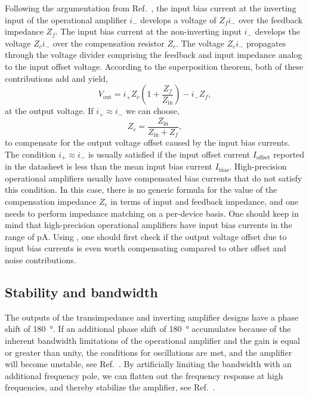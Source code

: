 Following the argumentation from Ref.~\cite[p.~383]{Terrel96}, the input bias current at the inverting input of the operational amplifier $i_-$ develops a voltage of $Z_fi_-$ over the feedback impedance $Z_f$.
The input bias current at the non-inverting input $i_-$ develops the voltage $Z_ci_-$ over the compensation resistor $Z_c$.
The voltage $Z_ci_-$ propagates through the voltage divider comprising the feedback and input impedance analog to the input offset voltage.
According to the superposition theorem, both of these contributions add and yield,
\begin{equation}
	V_\text{out}=i_+Z_c\left(1+\frac{Z_f}{Z_\text{in}}\right)-i_-Z_f
	\label{eq:input_bias_current},
\end{equation}
at the output voltage.
If $i_+\approx i_-$ we can choose,
\begin{equation}
	Z_c=\frac{Z_\text{in}}{Z_\text{in}+Z_f},
\end{equation}
 to compensate for the output voltage offset caused by the input bias currents.
The condition $i_+\approx i_-$ is usually satisfied if the input offset current $I_\text{offset}$ reported in the datasheet is less than the mean input bias current $I_\text{bias}$.
High-precision operational amplifiers usually have compensated bias currents that do not satisfy this condition.
In this case, there is no generic formula for the value of the compensation impedance $Z_c$ in terms of input and feedback impedance, and one needs to perform impedance matching on a per-device basis.
One should keep in mind that high-precision operational amplifiers have input bias currents in the range of \si{\pico\ampere}.
Using , one should first check if the output voltage offset due to input bias currents is even worth compensating compared to other offset and noise contributions.

\subsection{Stability and bandwidth}\label{sec:opamp_stability_bandwidth}

The outputs of the transimpedance and inverting amplifier designs have a phase shift of \SI{180}{\degree}.
If an additional phase shift of \SI{180}{\degree} accumulates because of the inherent bandwidth limitations of the operational amplifier and the gain is equal or greater than unity, the conditions for oscillations are met, and the amplifier will become unstable, see Ref.~\cite[p.~395]{Terrel96}.
By artificially limiting the bandwidth with an additional frequency pole, we can flatten out the frequency response at high frequencies, and thereby stabilize the amplifier, see Ref.~\cite[p.~184]{Kay12}.

